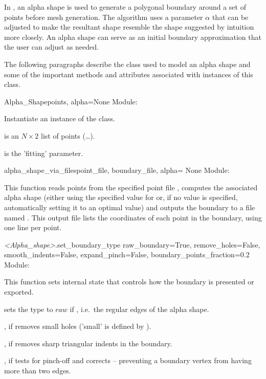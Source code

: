 \documentclass{manual}
\begin{document}
In \anuga, an alpha shape is used to generate a polygonal boundary
around a set of points before mesh generation. The algorithm uses a
parameter $\alpha$ that can be adjusted to make the resultant shape
resemble the shape suggested by intuition more closely. An alpha
shape can serve as an initial boundary approximation that the user
can adjust as needed.

The following paragraphs describe the class used to model an alpha
shape and some of the important methods and attributes associated
with instances of this class.

\label{class:alpha_shape}
\begin{classdesc}{Alpha_Shape}{points, alpha=None}
Module: 

Instantiate an instance of the  class.

 is an $N \times 2$ list of points (\code{[[x1, y1],[x2, y2]}\ldots\code{]}).

 is the 'fitting' parameter.
\end{classdesc}

\begin{funcdesc}{alpha_shape_via_files}{point_file, boundary_file, alpha= None}
Module: 

This function reads points from the specified point file
, computes the associated alpha shape (either
using the specified value for  or, if no value is
specified, automatically setting it to an optimal value) and outputs
the boundary to a file named . This output file
lists the coordinates  of each point in the boundary,
using one line per point.
\end{funcdesc}

\label{ref:method_set_boundary_type}
\begin{methoddesc}{\emph{<Alpha_shape>}.set_boundary_type}
        {raw_boundary=True,
         remove_holes=False,
         smooth_indents=False,
         expand_pinch=False,
         boundary_points_fraction=0.2}
Module: 

This function sets internal state that controls how the 
boundary is presented or exported.

 sets the type to $raw$ if ,
i.e.\ the regular edges of the alpha shape.

, if  removes small holes ('small' is defined by
).

, if  removes sharp triangular indents in
the boundary.

, if  tests for pinch-off and
corrects -- preventing a boundary vertex from having more than two edges.
\end{methoddesc}
\end{document}
